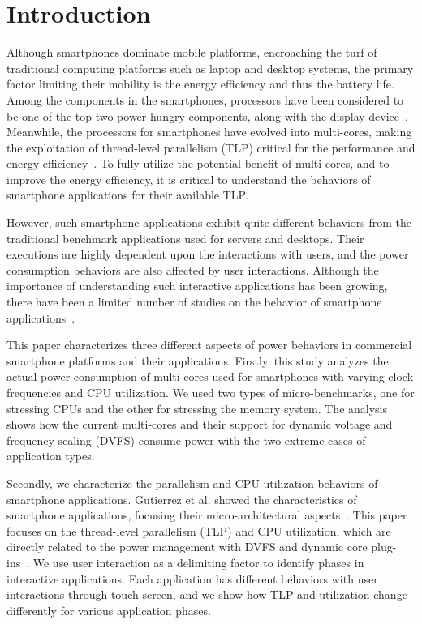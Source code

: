\section{Introduction}

Although smartphones dominate mobile platforms, encroaching the turf of traditional computing platforms such
as laptop and desktop systems, the primary factor limiting their mobility is the energy efficiency and thus the battery 
life. Among the components in the smartphones, processors have been considered to be one of the top two power-hungry
components, along with the display device~\cite{smartphonepower,intothewild}. Meanwhile, the processors for smartphones have 
evolved into multi-cores, making the exploitation of thread-level parallelism (TLP) critical 
for the performance and energy efficiency~\cite{desktopTLP}. To fully utilize the potential benefit of multi-cores, and 
to improve the energy efficiency, it is critical to understand the behaviors of smartphone applications for their
available TLP.

However, such smartphone applications exhibit quite different behaviors from the traditional benchmark applications
used for servers and desktops. Their executions are highly dependent upon the interactions with users, and the
power consumption behaviors are also affected by user interactions. Although the importance of understanding such
interactive applications has been growing, there  have been a limited number of studies on the behavior of 
smartphone applications~\cite{intothewild, characterinteractive}.

This paper characterizes three different aspects of power behaviors in commercial smartphone platforms and 
their applications. Firstly, this study analyzes the actual power consumption of multi-cores used for
smartphones with varying clock frequencies and CPU utilization. We used two types of micro-benchmarks,
one for stressing CPUs and the other for stressing the memory system. The analysis shows how the 
current multi-cores and their support for dynamic voltage and frequency scaling (DVFS) consume power 
with the two extreme cases of application types.

Secondly, we characterize the parallelism and CPU utilization behaviors of smartphone applications.
Gutierrez et al. showed the characteristics of smartphone applications, focusing their micro-architectural
aspects~\cite{characterinteractive}. This paper focuses on the thread-level parallelism (TLP) and 
CPU utilization, which are directly related to the power management with DVFS and dynamic core plug-ins~\cite{packandcap}.
We use user interaction as a delimiting factor to identify phases in interactive applications.
Each application has different behaviors with user interactions through touch screen, and we show
how TLP and utilization change differently for various application phases.

